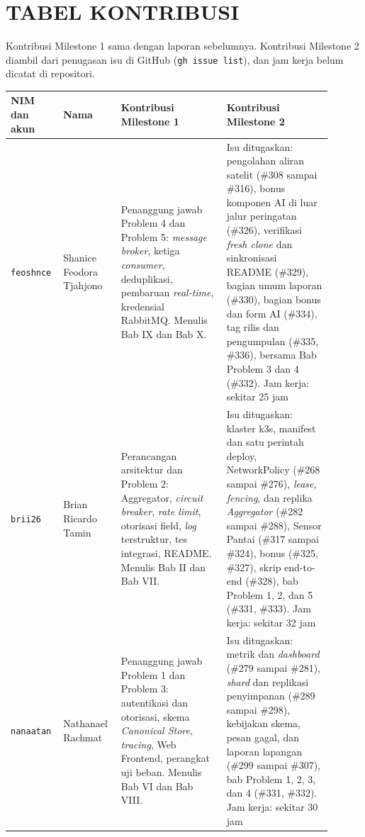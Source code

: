 \chapter*{TABEL KONTRIBUSI}

Kontribusi Milestone 1 sama dengan laporan sebelumnya. Kontribusi Milestone 2 diambil dari penugasan isu di GitHub (\texttt{gh issue list}), dan jam kerja belum dicatat di repositori.

\begin{longtable}[]{|>{\raggedright\arraybackslash}p{0.11\linewidth}|>{\raggedright\arraybackslash}p{0.17\linewidth}|>{\raggedright\arraybackslash}p{0.31\linewidth}|>{\raggedright\arraybackslash}p{0.31\linewidth}|}
\hline
NIM dan akun & Nama & Kontribusi Milestone 1 & Kontribusi Milestone 2 \\
\hline
\endhead
13523097 \texttt{feoshnce} & Shanice Feodora Tjahjono & Penanggung jawab Problem 4 dan Problem 5: \textit{message broker}, ketiga \textit{consumer}, deduplikasi, pembaruan \textit{real-time}, kredensial RabbitMQ. Menulis Bab IX dan Bab X. & Isu ditugaskan: pengolahan aliran satelit (\#308 sampai \#316), bonus komponen AI di luar jalur peringatan (\#326), verifikasi \textit{fresh clone} dan sinkronisasi README (\#329), bagian umum laporan (\#330), bagian bonus dan form AI (\#334), tag rilis dan pengumpulan (\#335, \#336), bersama Bab Problem 3 dan 4 (\#332). Jam kerja: sekitar 25 jam \\
\hline
13523126 \texttt{brii26} & Brian Ricardo Tamin & Perancangan arsitektur dan Problem 2: Aggregator, \textit{circuit breaker}, \textit{rate limit}, otorisasi field, \textit{log} terstruktur, tes integrasi, README. Menulis Bab II dan Bab VII. & Isu ditugaskan: klaster k3s, manifest dan satu perintah deploy, NetworkPolicy (\#268 sampai \#276), \textit{lease}, \textit{fencing}, dan replika \textit{Aggregator} (\#282 sampai \#288), Sensor Pantai (\#317 sampai \#324), bonus (\#325, \#327), skrip end-to-end (\#328), bab Problem 1, 2, dan 5 (\#331, \#333). Jam kerja: sekitar 32 jam \\
\hline
13523142 \texttt{nanaatan} & Nathanael Rachmat & Penanggung jawab Problem 1 dan Problem 3: autentikasi dan otorisasi, skema \textit{Canonical Store}, \textit{tracing}, Web Frontend, perangkat uji beban. Menulis Bab VI dan Bab VIII. & Isu ditugaskan: metrik dan \textit{dashboard} (\#279 sampai \#281), \textit{shard} dan replikasi penyimpanan (\#289 sampai \#298), kebijakan skema, pesan gagal, dan laporan lapangan (\#299 sampai \#307), bab Problem 1, 2, 3, dan 4 (\#331, \#332). Jam kerja: sekitar 30 jam \\
\hline
\end{longtable}

